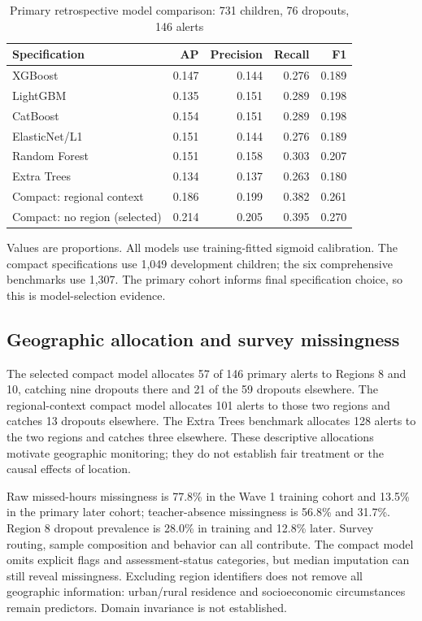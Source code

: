 \documentclass[conference,a4paper]{IEEEtran}
\newcommand{\tabnote}[1]{\par\vspace{3pt}\begin{minipage}{\linewidth}\footnotesize\raggedright #1\end{minipage}}
\begin{document}
\begin{table}[!t]\centering\small
\caption{Primary retrospective model comparison: 731 children, 76 dropouts, 146 alerts}\label{tab:comparison}
\begin{tabular}{lrrrr}\toprule
Specification & AP & Precision & Recall & F1\\\midrule
XGBoost & 0.147 & 0.144 & 0.276 & 0.189 \\
LightGBM & 0.135 & 0.151 & 0.289 & 0.198 \\
CatBoost & 0.154 & 0.151 & 0.289 & 0.198 \\
ElasticNet/L1 & 0.151 & 0.144 & 0.276 & 0.189 \\
Random Forest & 0.151 & 0.158 & 0.303 & 0.207 \\
Extra Trees & 0.134 & 0.137 & 0.263 & 0.180 \\
Compact: regional context & 0.186 & 0.199 & 0.382 & 0.261 \\
Compact: no region (selected) & 0.214 & 0.205 & 0.395 & 0.270 \\
\bottomrule\end{tabular}
\tabnote{Values are proportions. All models use training-fitted sigmoid calibration. The compact specifications use 1,049 development children; the six comprehensive benchmarks use 1,307. The primary cohort informs final specification choice, so this is model-selection evidence.}
\end{table}

\subsection{\textbf{Geographic allocation and survey missingness}}
The selected compact model allocates 57 of 146 primary alerts to Regions 8 and 10, catching nine dropouts there and 21 of the 59 dropouts elsewhere. The regional-context compact model allocates 101 alerts to those two regions and catches 13 dropouts elsewhere. The Extra Trees benchmark allocates 128 alerts to the two regions and catches three elsewhere. These descriptive allocations motivate geographic monitoring; they do not establish fair treatment or the causal effects of location.

Raw missed-hours missingness is 77.8\% in the Wave 1 training cohort and 13.5\% in the primary later cohort; teacher-absence missingness is 56.8\% and 31.7\%. Region 8 dropout prevalence is 28.0\% in training and 12.8\% later. Survey routing, sample composition and behavior can all contribute. The compact model omits explicit flags and assessment-status categories, but median imputation can still reveal missingness. Excluding region identifiers does not remove all geographic information: urban/rural residence and socioeconomic circumstances remain predictors. Domain invariance is not established.
\end{document}

